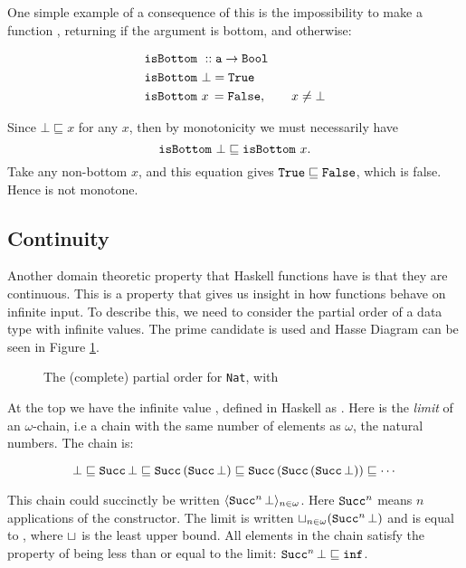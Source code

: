 \newpage

One simple example of a consequence of this is the impossibility to
make a function , returning  if the
argument is bottom, and  otherwise:

\begin{align*}
& \hs{isBottom} \w :: \hs{a} \rightarrow \hs{Bool} \\
& \hs{isBottom} \w \bot = \hs{True} \\
& \hs{isBottom} \w x \, = \hs{False}, \qquad x \neq \bot
\end{align*}

\noindent
Since $\bot \sqsubseteq x$ for any $x$, then by monotonicity we must
necessarily have
$$\hs{isBottom} \w \bot \sqsubseteq \hs{isBottom} \w x.$$
Take any non-bottom $x$, and this equation gives
$\hs{True} \sqsubseteq \hs{False}$, which is false. Hence
 is not monotone.

\subsection{Continuity}
Another domain theoretic property that Haskell functions have is that
they are continuous. This is a property that gives us insight in how
functions behave on infinite input.  To describe this, we need to
consider the partial order of a data type with infinite values. The
prime candidate  is used and Hasse
Diagram can be seen in Figure \ref{fig:natcpo}.

\begin{figure}[h]
\centering

\caption{
    The (complete) partial order for \texttt{Nat}, with 
    \label{fig:natcpo}
}
\end{figure}

At the top we have the infinite value , defined in Haskell as
. Here  is the \emph{limit} of an
$\omega$-chain, i.e a chain with the same number of elements as
$\omega$, the natural numbers. The chain is:

\begin{equation*}
\bot \sqsubseteq
\hs{Succ} \, \bot \sqsubseteq
\hs{Succ} \, (\hs{Succ} \, \bot) \sqsubseteq
\hs{Succ} \, (\hs{Succ} \, (\hs{Succ} \, \bot)) \sqsubseteq
\cdots
\end{equation*}

This chain could succinctly be written $\langle \hs{Succ}^n \, \bot
\rangle_{n \in \omega}$.  Here $\hs{Succ}^n$ means $n$ applications of
the  constructor. The limit is written $\lub{n \in
  \omega}(\hs{Succ}^n \, \bot)$ and is equal to , where
$\sqcup_{}$ is the least upper bound. All elements in the chain satisfy
the property of being less than or equal to the limit: $\hs{Succ}^n \,
\bot \sqsubseteq \hs{inf}$.

